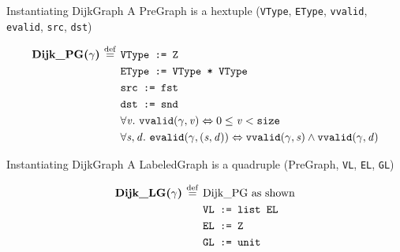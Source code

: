 \documentclass[usenames, xcolor=dvipsnames]{beamer}
\newcommand{\sz}{\texttt{size}}
\newcommand{\defeq}{\mathbin{\overset{\mathrm{def}}{=}}}
\newcommand{\m}[1]{\ensuremath{\mathit{#1}}} %
\newcommand{\bi}{\Leftrightarrow} %
\begin{document}
\begin{frame}{Instantiating DijkGraph}
A PreGraph is a hextuple (\texttt{VType}, \texttt{EType}, \texttt{vvalid}, \texttt{evalid}, \texttt{src}, \texttt{dst})
\vspace{-1.5em}
\begin{flushleft}
\begin{equation*}
\begin{split}
\textbf{Dijk\_PG($\gamma$) $\defeq$ \null} & \texttt{VType := Z} \\
                    &\texttt{EType := VType * VType} \\
                    &\texttt{src := fst} \\
                    &\texttt{dst := snd} \\ 
                    &\forall \m{v}.~\texttt{vvalid}(\gamma, \m{v}) \bi 0 \le \m{v} < {\sz} \\
                    &\forall \m{s,d}.~\texttt{evalid}(\gamma, \m{(s,d)}) \bi \texttt{vvalid}(\gamma, \m{s}) \wedge \texttt{vvalid}(\gamma, \m{d})
\end{split}
\end{equation*}
\end{flushleft}
\end{frame}

\begin{frame}[fragile]{Instantiating DijkGraph}
A LabeledGraph is a quadruple (PreGraph, \texttt{VL}, \texttt{EL}, \texttt{GL})
\vspace{-1.5em}
\begin{flushleft}
\begin{equation*}
\begin{split}
\textbf{Dijk\_LG($\gamma$) $\defeq$ \null} &\text{Dijk\_PG as shown} \\
                  &\texttt{VL := list EL} \\
                  &\texttt{EL := Z} \\
                  &\texttt{GL := unit} 
\end{split}
\end{equation*}
\end{flushleft}
\end{frame}
\end{document}
